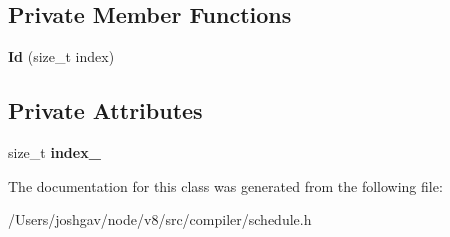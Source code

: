 \subsection*{Private Member Functions}
\begin{DoxyCompactItemize}
\item 
{\bfseries Id} (size\+\_\+t index)\hypertarget{classv8_1_1internal_1_1compiler_1_1_basic_block_1_1_id_a2a08b7ae9ed95a4444efeecb83f14526}{}\label{classv8_1_1internal_1_1compiler_1_1_basic_block_1_1_id_a2a08b7ae9ed95a4444efeecb83f14526}

\end{DoxyCompactItemize}
\subsection*{Private Attributes}
\begin{DoxyCompactItemize}
\item 
size\+\_\+t {\bfseries index\+\_\+}\hypertarget{classv8_1_1internal_1_1compiler_1_1_basic_block_1_1_id_aa5f96083d949cf87ee227098456750f3}{}\label{classv8_1_1internal_1_1compiler_1_1_basic_block_1_1_id_aa5f96083d949cf87ee227098456750f3}

\end{DoxyCompactItemize}


The documentation for this class was generated from the following file\+:\begin{DoxyCompactItemize}
\item 
/\+Users/joshgav/node/v8/src/compiler/schedule.\+h\end{DoxyCompactItemize}
